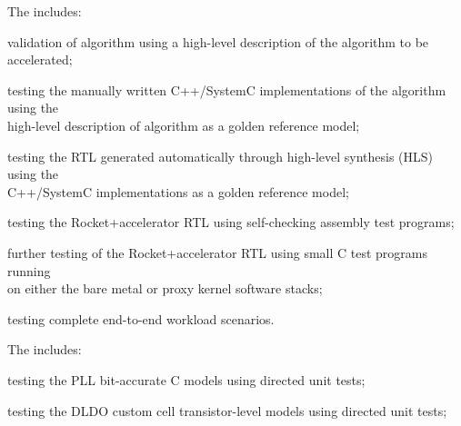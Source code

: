 \begin{cbxlist}{1.5em}{1em}{1em}
\begin{cbxlist}[--]{1.5em}{0em}{0em}
    \end{cbxlist}

 \item The  includes:

    \smallskip
    \begin{cbxlist}[--]{1.5em}{0em}{0em}
      \raggedright

      \item validation of algorithm using a high-level description of the
         algorithm to be accelerated;

      \item testing the manually written C++/SystemC implementations of
         the algorithm using the \\\hspace{0.5em}high-level description
         of algorithm as a golden reference model;

      \item testing the RTL generated automatically through high-level
         synthesis (HLS) using the \\\hspace{0.5em}C++/SystemC
         implementations as a golden reference model;

      \item testing the Rocket+accelerator RTL using self-checking
         assembly test programs;

      \item further testing of the Rocket+accelerator RTL using small C
         test programs running \\\hspace{0.5em}on either the bare metal
         or proxy kernel software stacks;

      \item testing complete end-to-end workload scenarios.

    \end{cbxlist}

 \item The  includes:

    \smallskip
    \begin{cbxlist}[--]{1.5em}{0em}{0em}
      \raggedright

      \item testing the PLL bit-accurate C models using directed unit
         tests;

      \item testing the DLDO custom cell transistor-level models using
         directed unit tests;


\end{cbxlist}
\end{cbxlist}
